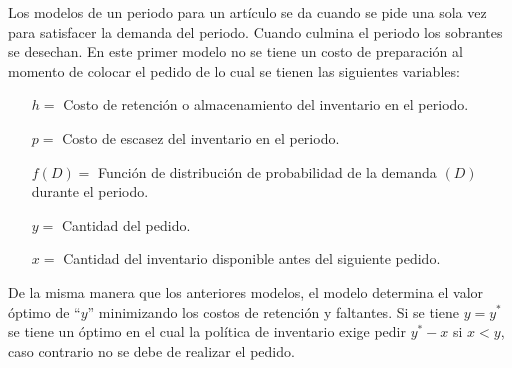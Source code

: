 Los modelos de un periodo para un artículo se da cuando se pide una sola vez para satisfacer la demanda del periodo. Cuando culmina el periodo los sobrantes se desechan. En este primer modelo no se tiene un costo de preparación al momento de colocar el pedido de lo cual se tienen las siguientes variables:
\begin{itemize}
	\item[$h=$] Costo de retención o almacenamiento del inventario en el periodo.
	\item[$p=$] Costo de escasez del inventario en el periodo.
	\item[$f(D)=$] Función de distribución de probabilidad de la demanda $(D)$ durante el periodo.
	\item[$y=$] Cantidad del pedido.
	\item[$x=$] Cantidad del inventario disponible antes del siguiente pedido.
\end{itemize}
De la misma manera que los anteriores modelos, el modelo determina el valor óptimo de ``$y$'' minimizando los costos de retención y faltantes. Si se tiene $y = y^*$ se tiene un óptimo en el cual la política de inventario exige pedir $y^* - x$ si $x < y$, caso contrario no se debe de realizar el pedido.

